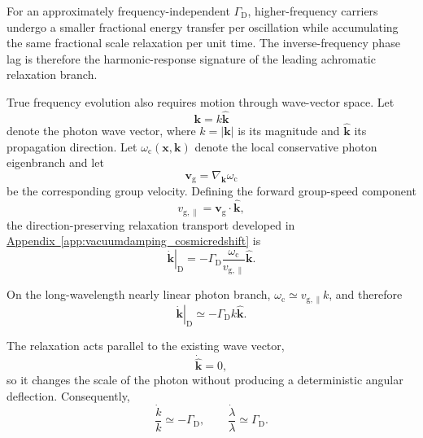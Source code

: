 For an approximately frequency-independent $\Gamma_{\mathrm D}$, higher-frequency carriers undergo a smaller fractional energy transfer per oscillation while accumulating the same fractional scale relaxation per unit time. The inverse-frequency phase lag is therefore the harmonic-response signature of the leading achromatic relaxation branch.

True frequency evolution also requires motion through wave-vector space. Let
\begin{equation}
    \mathbf{k}
    =
    k\hat{\mathbf{k}}
\end{equation}
denote the photon wave vector, where $k=|\mathbf{k}|$ is its magnitude and $\hat{\mathbf{k}}$ its propagation direction. Let $\omega_{\mathrm c}(\mathbf{x},\mathbf{k})$ denote the local conservative photon eigenbranch and let
\begin{equation}
    \mathbf{v}_{\mathrm g}
    =
    \nabla_{\mathbf{k}}
    \omega_{\mathrm c}
\end{equation}
be the corresponding group velocity. Defining the forward group-speed component
\begin{equation}
    v_{\mathrm{g},\parallel}
    =
    \mathbf{v}_{\mathrm g}
    \cdot
    \hat{\mathbf{k}},
\end{equation}
the direction-preserving relaxation transport developed in
\hyperref[app:vacuumdamping_cosmicredshift]{Appendix~\ref*{app:vacuumdamping_cosmicredshift}}
is
\begin{equation}
    \left.
        \dot{\mathbf{k}}
    \right|_{\mathrm D}
    =
    -\Gamma_{\mathrm D}
    \frac{\omega_{\mathrm c}}
    {v_{\mathrm{g},\parallel}}
    \hat{\mathbf{k}}.
\end{equation}

On the long-wavelength nearly linear photon branch,
$\omega_{\mathrm c}\simeq v_{\mathrm{g},\parallel}k$,
and therefore
\begin{equation}
    \left.
        \dot{\mathbf{k}}
    \right|_{\mathrm D}
    \simeq
    -\Gamma_{\mathrm D}
    k
    \hat{\mathbf{k}}.
\end{equation}

The relaxation acts parallel to the existing wave vector,
\begin{equation}
    \dot{\hat{\mathbf{k}}}
    =
    0,
\end{equation}
so it changes the scale of the photon without producing a deterministic angular deflection. Consequently,
\begin{equation}
    \frac{\dot k}{k}
    \simeq
    -\Gamma_{\mathrm D},
    \qquad
    \frac{\dot\lambda}{\lambda}
    \simeq
    \Gamma_{\mathrm D}.
\end{equation}

